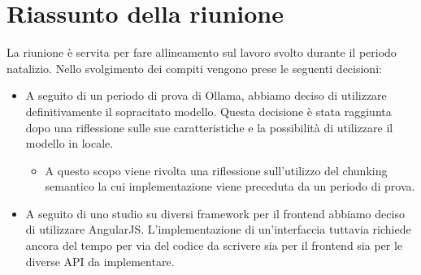 \section{Riassunto della riunione}
La riunione è servita per fare allineamento sul lavoro svolto durante il periodo natalizio. Nello svolgimento dei compiti vengono prese le seguenti decisioni: 
\begin{itemize}
    \item A seguito di un periodo di prova di Ollama, abbiamo deciso di utilizzare definitivamente il sopracitato modello. Questa decisione è stata raggiunta dopo una riflessione sulle sue caratteristiche e la possibilità di utilizzare il modello in locale.
    \begin{itemize}
        \item A questo scopo viene rivolta una riflessione sull'utilizzo del chunking semantico la cui implementazione viene preceduta da un periodo di prova.
    \end{itemize}
    \item A seguito di uno studio su diversi framework per il frontend abbiamo deciso di utilizzare AngularJS. L'implementazione di un'interfaccia tuttavia richiede ancora del tempo per via del codice da scrivere sia per il frontend sia per le diverse API da implementare.
\end{itemize}